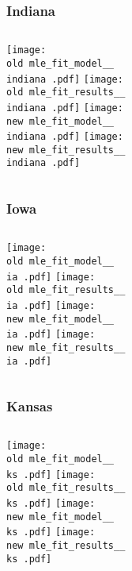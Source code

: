 \documentclass{beamer}
\newcommand{\old}{api-370-prod/pyseir/state_summaries/reports/}
\newcommand{\new}{new/pyseir/state_summaries/reports/}
\newcommand{\indiana}{Indiana__18}
\newcommand{\ia}{Iowa__19}
\newcommand{\ks}{Kansas__20}
\begin{document}
\begin{frame}
\frametitle{Indiana}
    \begin{columns}[t]

       \texttt{[image: \\old mle\_fit\_model\_\_\\indiana .pdf]}
       \texttt{[image: \\old mle\_fit\_results\_\_\\indiana .pdf]}   
       \texttt{[image: \\new mle\_fit\_model\_\_\\indiana .pdf]}
       \texttt{[image: \\new mle\_fit\_results\_\_\\indiana .pdf]}   
\end{columns}
\end{frame}


\begin{frame}
\frametitle{Iowa}
    \begin{columns}[t]

       \texttt{[image: \\old mle\_fit\_model\_\_\\ia .pdf]}
       \texttt{[image: \\old mle\_fit\_results\_\_\\ia .pdf]}   
       \texttt{[image: \\new mle\_fit\_model\_\_\\ia .pdf]}
       \texttt{[image: \\new mle\_fit\_results\_\_\\ia .pdf]}   
\end{columns}
\end{frame}


\begin{frame}
\frametitle{Kansas}
    \begin{columns}[t]

       \texttt{[image: \\old mle\_fit\_model\_\_\\ks .pdf]}
       \texttt{[image: \\old mle\_fit\_results\_\_\\ks .pdf]}   
       \texttt{[image: \\new mle\_fit\_model\_\_\\ks .pdf]}
       \texttt{[image: \\new mle\_fit\_results\_\_\\ks .pdf]}   
\end{columns}
\end{frame}
\end{document}
